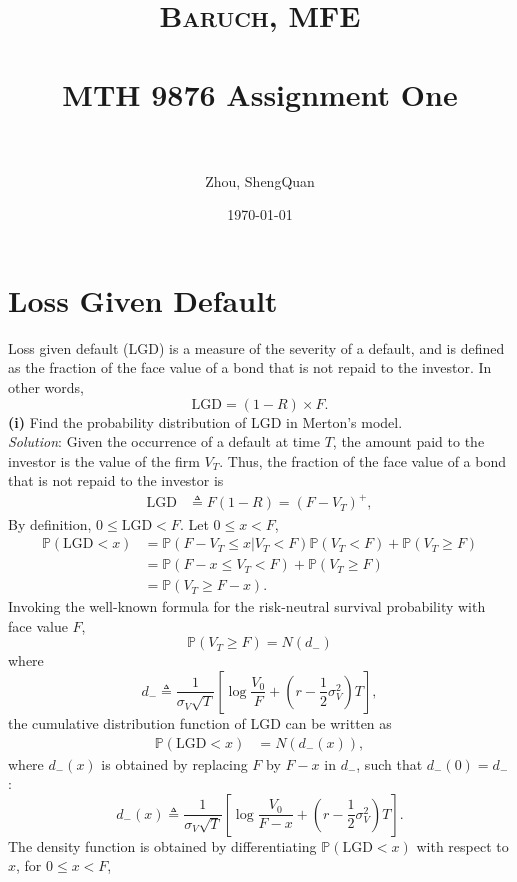\documentclass[paper=a4, fontsize=11pt]{scrartcl} %
\title{	
\normalfont \normalsize 
\textsc{Baruch, MFE} \\ [25pt] %
\horrule{0.5pt} \\[0.4cm] %
\huge MTH 9876 Assignment One\\  %
\horrule{2pt} \\[0.5cm] %
}
\author{Zhou, ShengQuan} %
\date{\normalsize\today} %
\numberwithin{equation}{section} %
\numberwithin{figure}{section} %
\numberwithin{table}{section} %
\begin{document}
	


\maketitle %

\newpage



\section{Loss Given Default}
Loss given default (LGD) is a measure of the severity of a default, and is
defined as the fraction of the face value of a bond that is not repaid to the
investor. In other words,
$$
\text{LGD} = (1-R)\times F.
$$
\textbf{(i)} Find the probability distribution of LGD in Merton's model.\\
\textit{Solution}: Given the occurrence of a default at time $T$, 
the amount paid to the investor is the value of the firm $V_T$. Thus,
the fraction of the face value of a bond that is not repaid to the investor is
\begin{align}
\nonumber \text{LGD} &\triangleq F(1-R) = \left(F - V_T\right)^+,
\end{align}
By definition, $0\le \text{LGD} < F$. Let $0\le x< F$,
\begin{align}
\nonumber \mathbb{P}\left(\text{LGD}<x\right) &= \mathbb{P}\left(F - V_T\le x | V_T<F \right)\mathbb{P}\left(V_T<F\right)+\mathbb{P}\left(V_T\ge F\right)\\
\nonumber &= \mathbb{P}\left(F-x\le V_T<F\right)+\mathbb{P}\left(V_T\ge F\right)\\
\nonumber &=\mathbb{P}\left(V_T\ge F-x\right).
\end{align}
Invoking the well-known formula for the risk-neutral survival probability with face value $F$,
$$
\mathbb{P}\left(V_T\ge F\right) = N(d_-)
$$
where
$$
d_- \triangleq \frac{1}{\sigma_V\sqrt{T}}\left[ \log\frac{V_0}{F} + \left(r -\frac{1}{2}\sigma_V^2\right)T \right],
$$
the cumulative distribution function of LGD can be written as
\begin{align}
\nonumber \mathbb{P}\left(\text{LGD}<x\right) &= N\left(d_-(x)\right),
\end{align}
where $d_-(x)$ is obtained by replacing $F$ by $F-x$ in $d_-$, such that $d_-(0)=d_-$:
$$
d_-(x) \triangleq \frac{1}{\sigma_V\sqrt{T}}\left[ \log\frac{V_0}{F-x} + \left(r -\frac{1}{2}\sigma_V^2\right)T \right].
$$
The density function is obtained by differentiating $\mathbb{P}\left(\text{LGD}<x\right)$ with respect to $x$, for $0\le x<F$,
\end{document}

